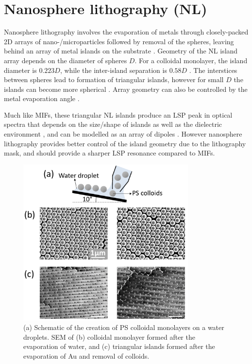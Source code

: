 \section{Nanosphere lithography (NL)}
Nanosphere lithography involves the evaporation of metals through closely-packed 2D arrays of nano-/microparticles followed by removal of the spheres, leaving behind an array of metal islands on the substrate \cite{Haynes2001}. Geometry of the NL island array depends on the diameter of spheres $D$. For a colloidal monolayer, the island diameter is $0.223D$, while the inter-island separation is $0.58D$ \cite{Hulteen1995}. The interstices between spheres lead to formation of triangular islands, however for small $D$ the islands can become more spherical \cite{Hulteen1999}. Array geometry can also be controlled by the metal evaporation angle \cite{Haynes2002}.

Much like MIFs, these triangular NL islands produce an LSP peak in optical spectra that depends on the size/shape of islands as well as the dielectric environment \cite{Jensen2000}, and can be modelled as an array of dipoles \cite{Malinsky2001, Jensen1999}. However nanosphere lithography provides better control of the island geometry due to the lithography mask, and should provide a sharper LSP resonance compared to MIFs.

\begin{figure}[h!] 
\centering    
\includegraphics[width=0.8\textwidth]{Fig9}
\caption{(a) Schematic of the creation of PS colloidal monolayers on a water droplets. SEM of (b) colloidal monolayer formed after the evaporation of water, and (c) triangular islands formed after the evaporation of Au and removal of colloids.}
\label{6Fig9}
\end{figure}
